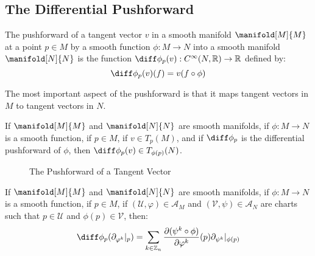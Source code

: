 \documentclass{article}                                                        %
\begin{document}
        \subsection{The Differential Pushforward}
            \begin{definition}
                The pushforward of a tangent vector $v$ in a smooth manifold
                $\manifold[M]{M}$ at a point $p\in{M}$ by a smooth function
                $\phi:M\rightarrow{N}$ into a smooth manifold $\manifold[N]{N}$
                is the function
                $\diff\phi_{p}(v):C^{\infty}(N,\mathbb{R})\rightarrow\mathbb{R}$
                defined by:
                \begin{equation}
                    \diff\phi_{p}(v)(f)=v(f\circ\phi)
                \end{equation}
            \end{definition}
            The most important aspect of the pushforward is that it maps tangent
            vectors in $M$ to tangent vectors in $N$.
            \begin{theorem}
                If $\manifold[M]{M}$ and $\manifold[N]{N}$ are smooth manifolds,
                if $\phi:M\rightarrow{N}$ is a smooth function, if $p\in{M}$,
                if $v\in{T}_{p}(M)$, and if $\diff\phi_{p}$ is the differential
                pushforward of $\phi$, then
                $\diff\phi_{p}(v)\in{T}_{\phi(p)}(N)$.
            \end{theorem}
            \begin{figure}[H]
                \centering
                \captionsetup{type=figure}
                
                \caption{The Pushforward of a Tangent Vector}
                \label{fig:Pushforward_of_Tangent_Vector}
            \end{figure}
            \begin{theorem}
                If $\manifold[M]{M}$ and $\manifold[N]{N}$ are smooth manifolds,
                if $\phi:M\rightarrow{N}$ is a smooth function, if $p\in{M}$, if
                $(\mathcal{U},\varphi)\in\mathcal{A}_{M}$ and
                $(\mathcal{V},\psi)\in\mathcal{A}_{N}$ are charts such that
                $p\in\mathcal{U}$ and $\phi(p)\in\mathcal{V}$, then:
                \begin{equation}
                    \diff\phi_{p}(\partial_{\varphi^{k}}|_{p})=
                    \sum_{k\in\mathbb{Z}_{n}}
                    \frac{\partial(\psi^{k}\circ\phi)}{\partial\varphi^{k}}(p)
                    \partial_{\psi^{k}}|_{\phi(p)}
                \end{equation}
            \end{theorem}
\end{document}
